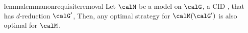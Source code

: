 









\begin{restatable}{lemma}{lemmanonrequisiteremoval}%
\label{le:dred-performance}
Let 
$\calM$ be a model on 
$\calG$, a CID \withSR, 
that has $d$-reduction $\calG'$, 
Then, 
any optimal strategy for $\calM(\calG')$ is also optimal for $\calM$.
\end{restatable}




